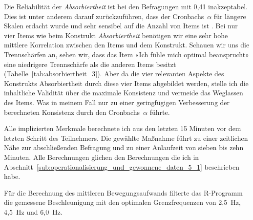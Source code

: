 Die Reliabilität der \emph{Absorbiertheit} ist bei den Befragungen mit 0,41 inakzeptabel. Dies ist unter anderem darauf zurückzuführen, dass der Cronbachs~$\alpha$ für längere Skalen erdacht wurde und sehr sensibel auf die Anzahl von Items ist \citep{Cortina1993}. Bei nur vier Items wie beim Konstrukt \emph{Absorbiertheit} benötigen wir eine sehr hohe mittlere Korrelation zwischen den Items und dem Konstrukt. Schauen wir uns die Trennschärfen an, sehen wir, dass das Item «Ich fühle mich optimal beansprucht» eine niedrigere Trennschärfe als die anderen Items besitzt (Tabelle~\ref{tab:absorbiertheit_3}). Aber da die vier relevanten Aspekte des Konstrukts Absorbiertheit durch diese vier Items abgebildet werden, stelle ich die inhaltliche Validität über die maximale Konsistenz und vermeide das Weglassen des Items. Was in meinem Fall nur zu einer geringfügigen Verbesserung der berechneten Konsistenz durch den Cronbachs~$\alpha$ führte. 

Alle implizierten Merkmale berechnete ich aus den letzten 15 Minuten vor dem letzten Schritt des Teilnehmers. Die gewählte Maßnahme führt zu einer zeitlichen Nähe zur abschließenden Befragung und zu einer Anlaufzeit von sieben bis zehn Minuten. Alle Berechnungen glichen den Berechnungen die ich in Abschnitt~\ref{sub:operationalisierung_und_gewonnene_daten_5_1} beschrieben habe.

Für die Berechnung des mittleren Bewegungsaufwands filterte das R-Programm die gemessene Beschleunigung mit den optimalen Grenzfrequenzen von 2,5~Hz, 4,5~Hz und 6,0~Hz. 

